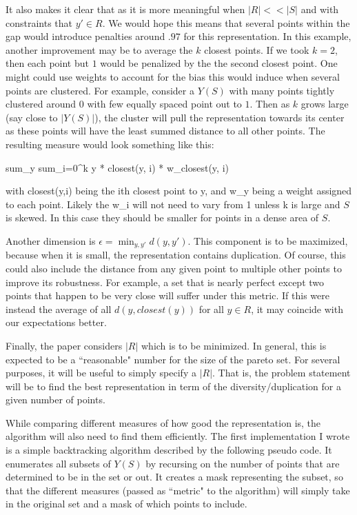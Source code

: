 \documentclass{article}
\begin{document}
{{It also makes it clear that as it is more meaningful when $|R| << |S|$ and with constraints that $y' \in R$.
We would hope this means that several points within the gap would introduce penalties around $.97$ for this representation.
In this example, another improvement may be to average the $k$ closest points.
If we took $k = 2$, then each point but $1$ would be penalized by the the second closest point.
One might could use weights to account for the bias this would induce when several points are clustered.
For example, consider a $Y(S)$ with many points tightly clustered around $0$ with few equally spaced point out to $1$.
Then as $k$ grows large (say close to $|Y(S)|$), the cluster will pull the representation towards its center as these points will have the least summed distance to all other points.
The resulting measure would look something like this:

sum_y sum_i=0^k y * closest(y, i) * w_{closest(y, i)}

with closest(y,i) being the ith closest point to y, and w_y being a weight assigned to each point.
Likely the w_i will not need to vary from 1 unless k is large and $S$ is skewed.
In this case they should be smaller for points in a dense area of $S$.


Another dimension is $\epsilon = \min_{y,y'} d(y,y')$.
This component is to be maximized, because when it is small, the representation contains duplication.
Of course, this could also include the distance from any given point to multiple other points to improve its robustness.
For example, a set that is nearly perfect except two points that happen to be very close will suffer under this metric.
If this were instead the average of all $d(y, closest(y))$ for all $y \in R$, it may coincide with our expectations better.

Finally, the paper considers $|R|$ which is to be minimized.
In general, this is expected to be a ``reasonable" number for the size of the pareto set.
For several purposes, it will be useful to simply specify a $|R|$.
That is, the problem statement will be to find the best representation in term of the diversity/duplication for a given number of points.


While comparing different measures of how good the representation is, the algorithm will also need to find them efficiently.
The first implementation I wrote is a simple backtracking algorithm described by the following pseudo code.
It enumerates all subsets of $Y(S)$ by recursing on the number of points that are determined to be in the set or out.
It creates a mask representing the subset, so that the different measures (passed as ``metric" to the algorithm) will simply take in the original set and a mask of which points to include.



}}
\end{document}
